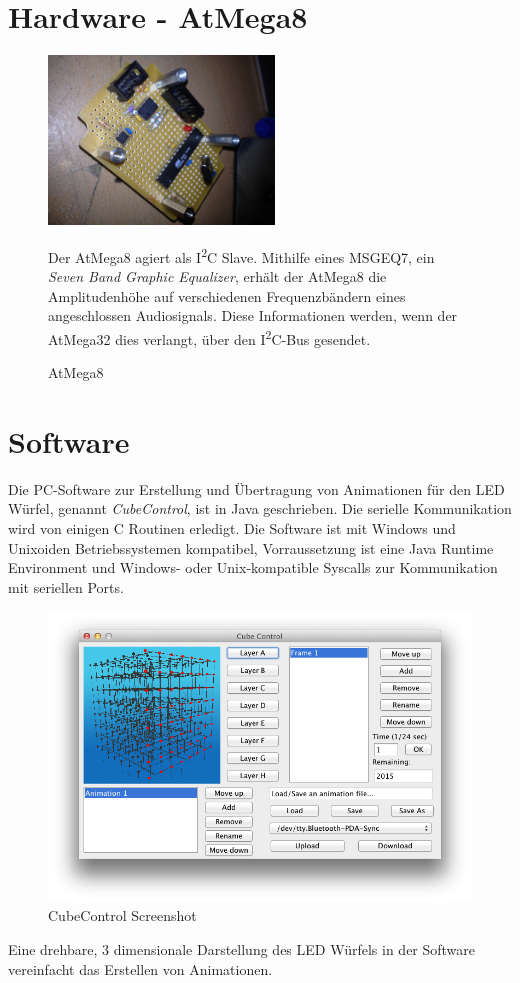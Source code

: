 \documentclass[11pt]{amsart}
\begin{document}
\section{Hardware - AtMega8}
\begin{figure}[hbp]
	\begin{minipage}[t]{6cm}
		\vspace{0pt}
		\centering
		\includegraphics[width=6cm]{platine2.jpg}
		\caption{AtMega8}
		\label{AtMega8}
	\end{minipage}
	\hfill
	\begin{minipage}[t]{7cm}
		\vspace{0pt}
		Der AtMega8 agiert als I\textsuperscript{2}C Slave. Mithilfe eines MSGEQ7, ein \textit{Seven Band Graphic Equalizer}, erhält der AtMega8 die Amplitudenhöhe auf verschiedenen Frequenzbändern eines angeschlossen Audiosignals. Diese Informationen werden, wenn der AtMega32 dies verlangt, über den I\textsuperscript{2}C-Bus gesendet.
	\end{minipage}
\end{figure}
\clearpage

\section{Software}
Die PC-Software zur Erstellung und Übertragung von Animationen für den LED Würfel, genannt \textit{CubeControl}, ist in Java geschrieben. Die serielle Kommunikation wird von einigen C Routinen erledigt. Die Software ist mit Windows und Unixoiden Betriebssystemen kompatibel, Vorraussetzung ist eine Java Runtime Environment und Windows- oder Unix-kompatible Syscalls zur Kommunikation mit seriellen Ports.

\begin{figure}[ht]
	\centering
	\includegraphics[width=16cm]{CubeControl.png}
	\caption{CubeControl Screenshot}
	\label{CubeControl}
\end{figure}

Eine drehbare, 3 dimensionale Darstellung des LED Würfels in der Software vereinfacht das Erstellen von Animationen.
\end{document}
